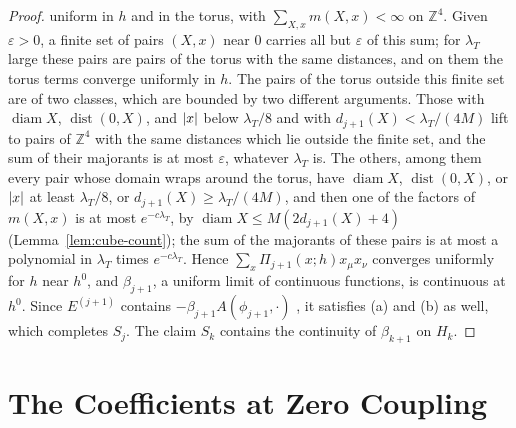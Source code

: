 \documentclass[11pt]{preprint}
\newcommand{\diam}{\operatorname{diam}}
\newcommand{\dist}{\operatorname{dist}}
\DeclarePairedDelimiter{\abs}{\lvert}{\rvert}
\numberwithin{equation}{section}
\theoremstyle{definition}
\theoremstyle{remark}
\theoremstyle{plain}
\begin{document}
\begin{proof}
uniform in $h$ and in the torus, with $\sum_{X,x}m(X, x) < \infty$ on $\mathbb Z^4$. Given $\varepsilon > 0$, a finite set of pairs $(X, x)$ near $0$ carries all but $\varepsilon$ of this sum; for $\lambda_T$ large these pairs are pairs of the torus with the same distances, and on them the torus terms converge uniformly in $h$. The pairs of the torus outside this finite set are of two classes, which are bounded by two different arguments. Those with $\diam X$, $\dist(0, X)$, and $\abs{x}$ below $\lambda_T/8$ and with $d_{j+1}(X) < \lambda_T/(4M)$ lift to pairs of $\mathbb Z^4$ with the same distances which lie outside the finite set, and the sum of their majorants is at most $\varepsilon$, whatever $\lambda_T$ is. The others, among them every pair whose domain wraps around the torus, have $\diam X$, $\dist(0, X)$, or $\abs{x}$ at least $\lambda_T/8$, or $d_{j+1}(X) \geq \lambda_T/(4M)$, and then one of the factors of $m(X, x)$ is at most $e^{-c\lambda_T}$, by $\diam X \leq M(2d_{j+1}(X) + 4)$ (Lemma~\ref{lem:cube-count}); the sum of the majorants of these pairs is at most a polynomial in $\lambda_T$ times $e^{-c\lambda_T}$. Hence $\sum_x\Pi_{j+1}(x; h)x_\mu x_\nu$ converges uniformly for $h$ near $h^0$, and $\beta_{j+1}$, a uniform limit of continuous functions, is continuous at $h^0$. Since $E^{(j+1)}$ contains $-\beta_{j+1}A(\phi_{j+1}, \cdot)$ \cite[(2.25), p.~259]{BalabanCRE}, it satisfies (a) and (b) as well, which completes $S_j$. The claim $S_k$ contains the continuity of $\beta_{k+1}$ on $H_k$.
\end{proof}

\section{The Coefficients at Zero Coupling}\label{sec:zero-coupling}
\end{document}
